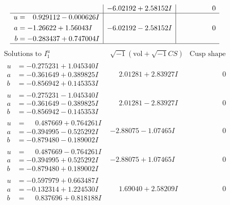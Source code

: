 \documentclass[1p]{elsarticle_modified}
\theoremstyle{definition}
\newcommand{\I}{\sqrt{-1}}
\begin{document}
$$\begin{array}{c|c|c}
 & -6.02192 + 2.58152 I & \phantom{-0.000000 } 0 \\ \hline\begin{aligned}
u &= \phantom{-}0.929112 - 0.000626 I \\
a &= -1.26622 + 1.56043 I \\
b &= -0.283437 + 0.747004 I\end{aligned}
 & -6.02192 - 2.58152 I & \phantom{-0.000000 } 0\\
 \hline 
 \end{array}$$\newpage$$\begin{array}{c|c|c}  
\text{Solutions to }I^u_{1}& \I (\text{vol} + \sqrt{-1}CS) & \text{Cusp shape}\\
 \hline 
\begin{aligned}
u &= -0.275231 + 1.045340 I \\
a &= -0.361649 + 0.389825 I \\
b &= -0.856942 + 0.145353 I\end{aligned}
 & \phantom{-}2.01281 + 2.83927 I & \phantom{-0.000000 } 0 \\ \hline\begin{aligned}
u &= -0.275231 - 1.045340 I \\
a &= -0.361649 - 0.389825 I \\
b &= -0.856942 - 0.145353 I\end{aligned}
 & \phantom{-}2.01281 - 2.83927 I & \phantom{-0.000000 } 0 \\ \hline\begin{aligned}
u &= \phantom{-}0.487669 + 0.764261 I \\
a &= -0.394995 - 0.525292 I \\
b &= -0.879480 - 0.189002 I\end{aligned}
 & -2.88075 - 1.07465 I & \phantom{-0.000000 } 0 \\ \hline\begin{aligned}
u &= \phantom{-}0.487669 - 0.764261 I \\
a &= -0.394995 + 0.525292 I \\
b &= -0.879480 + 0.189002 I\end{aligned}
 & -2.88075 + 1.07465 I & \phantom{-0.000000 } 0 \\ \hline\begin{aligned}
u &= -0.597979 + 0.663487 I \\
a &= -0.132314 + 1.224530 I \\
b &= \phantom{-}0.837696 + 0.818188 I\end{aligned}
 & \phantom{-}1.69040 + 2.58209 I & \phantom{-0.000000 } 0 \\ \hline\begin{aligned}

\end{aligned}
\end{array}$$
\end{document}
